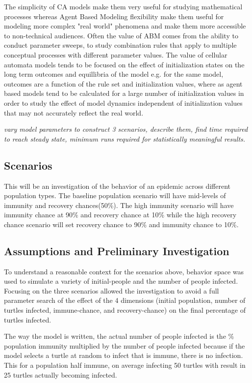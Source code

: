 \documentclass[11pt]{article} %
\begin{document}
The simplicity of CA models make them very useful for studying mathematical processes whereas Agent Based Modeling flexibility make them useful for modeling more complex "real world" phenomena and make them more accessible to non-technical audiences. Often the value of ABM comes from the ability to conduct parameter sweeps, to study combination rules that apply to multiple conceptual processes with different parameter values. The value of cellular automata models tends to be focused on the effect of initialization states on the long term outcomes and equillibria of the model e.g. for the same model, outcomes are a function of the rule set and initialization values, where as agent based models tend to be calculated for a large number of initialization values in order to study the effect of model dynamics independent of initialization values that may not accurately reflect the real world. 

\textit{ vary model parameters to construct 3 scenarios, describe them, find time required to reach steady state, minimum runs required for statistically meaningful results. }


\subsection{Scenarios}

This will be an investigation of the behavior of an epidemic across different population types. The baseline population scenario will have mid-levels of immunity and recovery chances(50\%). The high immunity scenario will have immunity chance at 90\% and recovery chance at 10\% while the high recovery chance scenario will set recovery chance to 90\% and immunity chance to 10\%. 

\subsection{Assumptions and Preliminary Investigation}

To understand a reasonable context for the scenarios above, behavior space was used to simulate a variety of initial-people and the number of people infected. Focusing on the three scenarios allowed the investigation to avoid a full parameter search of the effect of the 4 dimensions (initial population, number of turtles infected, immune-chance, and recovery-chance) on the final percentage of turtles infected. 

The way the model is written, the actual number of people infected is the \% population immunity multiplied by the number of people infected because if the model selects a turtle at random to infect that is immune, there is no infection. This for a population half immune, on average infecting 50 turtles with result in 25 turtles actually becoming infected. 
\end{document}
